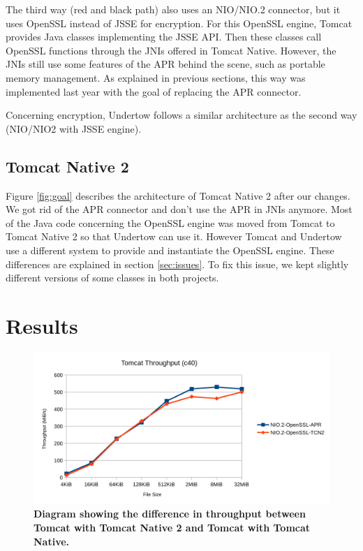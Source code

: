 \documentclass[11pt,a4paper,bibliography=totocnumbered]{scrartcl}
\def\mytitle{Tomcat Native 2}
\begin{document}
The third way (red and black path) also uses an NIO/NIO.2 connector, but it uses OpenSSL instead of JSSE for encryption. For this OpenSSL engine, Tomcat provides Java classes implementing the JSSE API. Then these classes call OpenSSL functions through the JNIs offered in Tomcat Native. However, the JNIs still use some features of the APR behind the scene, such as portable memory management. As explained in previous sections, this way was implemented last year with the goal of replacing the APR connector.

Concerning encryption, Undertow follows a similar architecture as the second way (NIO/NIO2 with JSSE engine).

\subsection{Tomcat Native 2}
Figure \ref{fig:goal} describes the architecture of \mytitle{} after our changes. We got rid of the APR connector and don't use the APR in JNIs anymore. Most of the Java code concerning the OpenSSL engine was moved from Tomcat to \mytitle{} so that Undertow can use it. However Tomcat and Undertow use a different system to provide and instantiate the OpenSSL engine. These differences are explained in section \ref{sec:issues}. To fix this issue, we kept slightly different versions of some classes in both projects.

\section{Results}
\begin{figure}[!h]
	\begin{center}
		\includegraphics[scale=0.23]{tomcat-throughput.pdf}
	\end{center}
	\caption{\textbf{Diagram showing the difference in throughput between Tomcat with \mytitle{} and Tomcat with Tomcat Native. }}
	\label{fig:tomcat-throughput}
\end{figure}
\end{document}
